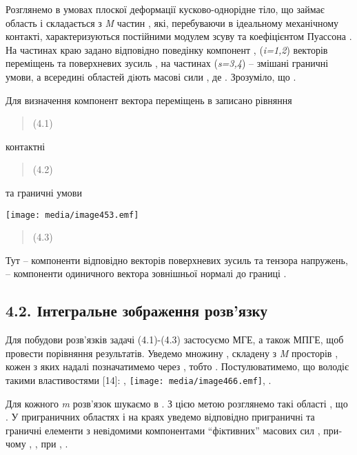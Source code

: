 Розглянемо в умовах плоскої деформації кусково-однорідне тіло, що займає
область і склада­ється з \emph{M} частин , які, перебуваючи в ідеальному
механічному контакті, характери­зу­ються постійними модулем зсуву та
коефіцієн­том Пуассона . На частинах краю задано від­по­відно пове­дінку
компонент , (\emph{i=1,2}) векторів переміщень та поверхневих зусиль ,
на частинах (\emph{s=3,4}) -- змішані граничні умови, а всере­динi
областей дiють масові сили , де . Зрозуміло, що .

Для визначення компонент вектора перемі­щень в записано рівняння

\begin{quote}
(4.1)
\end{quote}

контактні

\begin{quote}
(4.2)
\end{quote}

та граничні умови

\texttt{[image: media/image453.emf]}

\begin{quote}
(4.3)
\end{quote}

Тут -- компоненти відповідно век­торів поверхневих зу­силь та тензора
напру­жень, -- компоненти одиничного вектора зов­ніш­ньої нормалі до
границі .

\hypertarget{ux456ux43dux442ux435ux433ux440ux430ux43bux44cux43dux435-ux437ux43eux431ux440ux430ux436ux435ux43dux43dux44f-ux440ux43eux437ux432ux44fux437ux43aux443}{%
\subsection{4.2. Інтегральне зображення
розв'язку}\label{ux456ux43dux442ux435ux433ux440ux430ux43bux44cux43dux435-ux437ux43eux431ux440ux430ux436ux435ux43dux43dux44f-ux440ux43eux437ux432ux44fux437ux43aux443}}

Для побудови розв'язків задачі (4.1)-(4.3) застосуємо МГЕ, а також МПГЕ,
щоб провести порівняння результатів. Уведемо множину , складену з
\emph{M} просторів , кожен з яких надалі позначатимемо через , тобто .
Постулюватимемо, що володіє такими властивостями {[}14{]}: ,
\texttt{[image: media/image466.emf]}, .

Для кожного \emph{m} розв'язок шукаємо в . З цією метою розглянемо такі
області , що . У приграничних областях і на краях уведемо відповідно
пригра­нич­нi та граничні елементи з невiдомими компонентами
``фiктивних'' ма­сових сил , при­чому , , при , .

